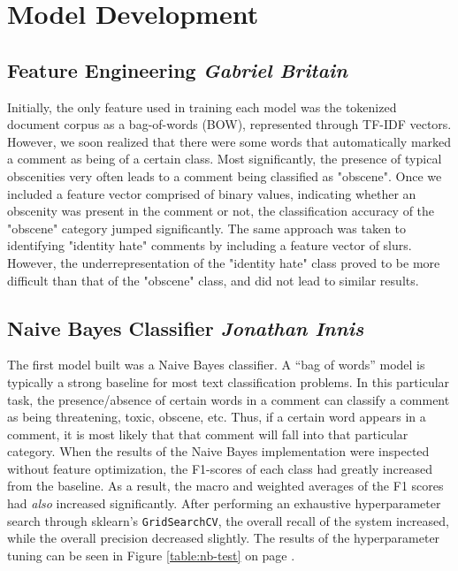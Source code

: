 \documentclass{article}
\begin{document}
\section{Model Development}{
  \subsection{Feature Engineering \textit{Gabriel Britain}}{
	  Initially, the only feature used in training each model was the tokenized
	  document corpus as a bag-of-words (BOW), represented through TF-IDF vectors.
	  However, we soon realized that there were some words that automatically
	  marked a comment as being of a certain class. Most significantly, the
	  presence of typical obscenities very often leads to a comment being
	  classified as "obscene". Once we included a feature vector comprised of
	  binary values, indicating whether an obscenity was present in the comment or
	  not, the classification accuracy of the "obscene" category jumped
	  significantly. The same approach was taken to identifying "identity hate"
	  comments by including a feature vector of slurs. However, the
	  underrepresentation of the "identity hate" class proved to be more difficult
	  than that of the "obscene" class, and did not lead to similar results.
  }
  \subsection{Naive Bayes Classifier \textit{Jonathan Innis}}{
	  The first model built was a Naive Bayes classifier. A “bag of words” model
	  is typically a strong baseline for most text classification problems. In
	  this particular task, the presence/absence of certain words in a comment can
	  classify a comment as being threatening, toxic, obscene, etc. Thus, if a
	  certain word appears in a comment, it is most likely that that comment will
	  fall into that particular category. When the results of the Naive Bayes
	  implementation were inspected without feature optimization, the F1-scores of
	  each class had greatly increased from the baseline. As a result, the macro
	  and weighted averages of the F1 scores had \textit{also} increased
	  significantly. After performing an exhaustive hyperparameter search through
	  sklearn's \texttt{GridSearchCV}, the overall recall of the system increased,
	  while the overall precision decreased slightly. The results of the
	  hyperparameter tuning can be seen in Figure \ref{table:nb-test} on page
	  \pageref{table:nb-test}.

}}
\end{document}
